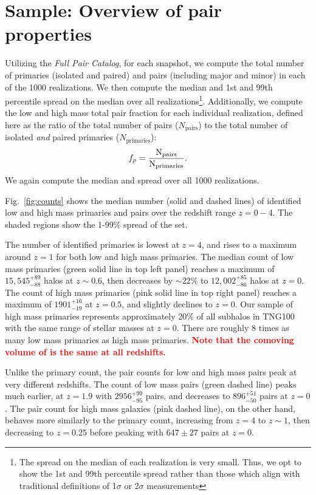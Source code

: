 \documentclass[linenumbers,twocolumn]{aastex631}
\newcommand{\add}[1]{\textcolor{red}{\textbf{#1}}}
\newcommand{\paircat}{\textit{Full Pair Catalog}}
\begin{document}
\section{Sample: Overview of pair properties} \label{sec:pairprops}
    Utilizing the \paircat, for each snapshot, we compute the total number of primaries (isolated and paired) and pairs (including major and minor) in each of the 1000 realizations. We then compute the median and 1st and 99th percentile spread on the median over all realizations\footnote{The spread on the median of each realization is very small. Thus, we opt to show the 1st and 99th percentile spread rather than those which align with traditional definitions of 1$\sigma$ or 2$\sigma$ measurements}. 
    Additionally, we compute the low and high mass total pair fraction for each individual realization, defined here as the ratio of the total number of pairs ($N_{\mathrm{pairs}}$) to the total number of isolated \textit{and} paired primaries ($N_{\mathrm{primaries}}$):
    $$f_{p}=\rm \frac{N_{\mathrm{pairs}}}{N_{\mathrm{primaries}}}.$$
    We again compute the median and spread over all 1000 realizations.
    
    Fig.~\ref{fig:counts} shows the median number (solid and dashed lines) of identified low and high mass primaries and pairs over the redshift range $z=0-4$.   
    The shaded regions show the 1-99\% spread of the set. 

    The number of identified primaries is lowest at $z=4$, and rises to a maximum around $z=1$ for both low and high mass primaries.
    The median count of low mass primaries (green solid line in top left panel) reaches a maximum of $15,545^{+89}_{-88}$ halos at $z\sim0.6$, then decreases by $\sim22\%$ to $12,002^{+85}_{-86}$ halos at $z=0$. 
    The count of high mass primaries (pink solid line in top right panel) reaches a maximum of $1901^{+16}_{-19}$ at $z=0.5$, and slightly declines to $z=0$. 
    Our sample of high mass primaries represents approximately 20\% of all subhalos in TNG100 with the same range of stellar masses at $z=0$.
    There are roughly 8 times as many low mass primaries as high mass primaries. \add{Note that the comoving volume of \tng{} is the same at all redshifts.}

    Unlike the primary count, the pair counts for low and high mass pairs peak at very different redshifts. 
    The count of low mass pairs (green dashed line) peaks much earlier, at $z=1.9$ with $2956^{+99}_{-95}$ pairs, and decreases to $896^{+51}_{-50}$ pairs at $z=0$.
    The pair count for high mass galaxies (pink dashed line), on the other hand, behaves more similarly to the primary count, increasing from $z=4$ to $z\sim1$, then decreasing to $z=0.25$ before peaking with $647\pm27$ pairs at $z=0$. 
\end{document}
